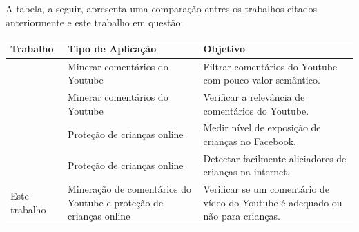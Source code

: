 A tabela, a seguir, apresenta uma comparação entres os trabalhos citados anteriormente e este trabalho em questão:


\begin{table}[H]
	{%
		\begin{tabular}{p{4cm}p{5cm}p{6cm}} %
			\toprule
			Trabalho & Tipo de Aplicação &  Objetivo \\
			\midrule \midrule
    		\cite{ammari2011filteringYt} & Minerar comentários do Youtube & Filtrar comentários do Youtube com pouco valor semântico.\\
    		\hline	
			\cite{schultes2013leave} & Minerar comentários do Youtube & Verificar a relevância de comentários do Youtube.\\
			\hline
			\cite{marioFalcao2016} & Proteção de crianças online & Medir nível de exposição de crianças no Facebook.\\
			\hline
			\cite{EnyoGoncalves2017} & Proteção de crianças online & Detectar facilmente aliciadores de crianças na internet.\\
			\hline
			Este trabalho & Mineração de comentários do Youtube e proteção de crianças online & Verificar se um comentário de vídeo do Youtube é adequado ou não para crianças.\\
			\bottomrule
		\end{tabular}%
	}{%
}
\end{table}

